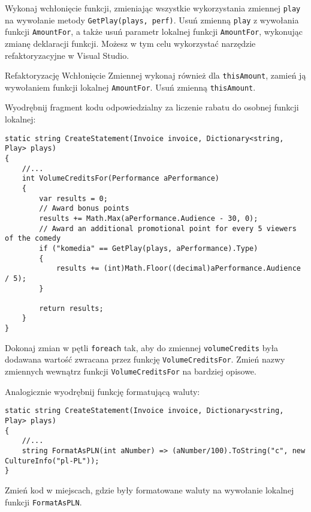 Wykonaj wchłonięcie funkcji, zmieniając wszystkie wykorzystania zmiennej \texttt{play} na wywołanie metody \texttt{GetPlay(plays, perf)}. Usuń zmienną \texttt{play} z wywołania funkcji \texttt{AmountFor}, a także usuń parametr lokalnej funkcji \texttt{AmountFor}, wykonując zmianę deklaracji funkcji. Możesz w tym celu wykorzystać narzędzie refaktoryzacyjne w Visual Studio. 

Refaktoryzację Wchłonięcie Zmiennej wykonaj również dla \texttt{thisAmount}, zamień ją wywołaniem funkcji lokalnej \texttt{AmountFor}. Usuń zmienną \texttt{thisAmount}.

Wyodrębnij fragment kodu odpowiedzialny za liczenie rabatu do osobnej funkcji lokalnej:
\begin{lstlisting}
static string CreateStatement(Invoice invoice, Dictionary<string, Play> plays)
{
	//...
	int VolumeCreditsFor(Performance aPerformance)
	{
		var results = 0;
		// Award bonus points
		results += Math.Max(aPerformance.Audience - 30, 0);
		// Award an additional promotional point for every 5 viewers of the comedy
		if ("komedia" == GetPlay(plays, aPerformance).Type)
		{
			results += (int)Math.Floor((decimal)aPerformance.Audience / 5);
		}
		
		return results;
	}
}
\end{lstlisting}
Dokonaj zmian w pętli \texttt{foreach} tak, aby do zmiennej \texttt{volumeCredits} była dodawana wartość zwracana przez funkcję \texttt{VolumeCreditsFor}. Zmień nazwy zmiennych wewnątrz funkcji \texttt{VolumeCreditsFor} na bardziej opisowe. 


Analogicznie wyodrębnij funkcję formatującą waluty:
\begin{lstlisting}
static string CreateStatement(Invoice invoice, Dictionary<string, Play> plays)
{
	//...
	string FormatAsPLN(int aNumber) => (aNumber/100).ToString("c", new CultureInfo("pl-PL"));
}	

\end{lstlisting}
Zmień kod w miejscach, gdzie były formatowane waluty na wywołanie lokalnej funkcji \texttt{FormatAsPLN}.


